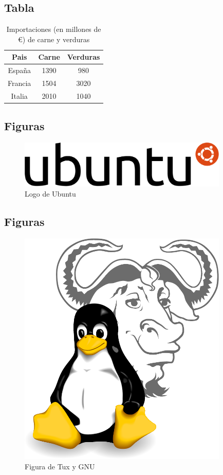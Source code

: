 \documentclass[a4,11pt]{article}
\begin{document}
\subsection{Tabla}
\begin{table}[h]
  \begin{center}
    \begin{tabular}{ccc}
      Pais   &Carne&Verduras\\ \hline
      España &1390 &980     \\
      Francia&1504 &3020    \\
      Italia &2010 &1040    \\
    \end{tabular}
  \end{center}
  \caption{Importaciones (en millones de €) de carne y verduras}\label{tab:importaciones}
\end{table}


\subsection{Figuras}
\begin{figure}[h]
  \begin{center}
    \includegraphics[width=10cm]{ubuntu_logo.pdf}
  \end{center}
  \caption{Logo de Ubuntu}\label{fig:ubuntu}
\end{figure} 


\subsection{Figuras}
\begin{figure}[h]
  \begin{center}
    \includegraphics[width=10cm]{Gnulinux.pdf}
  \end{center}
  \caption{Figura de Tux y GNU}\label{fig:gnutux}
\end{figure} 
\end{document}
